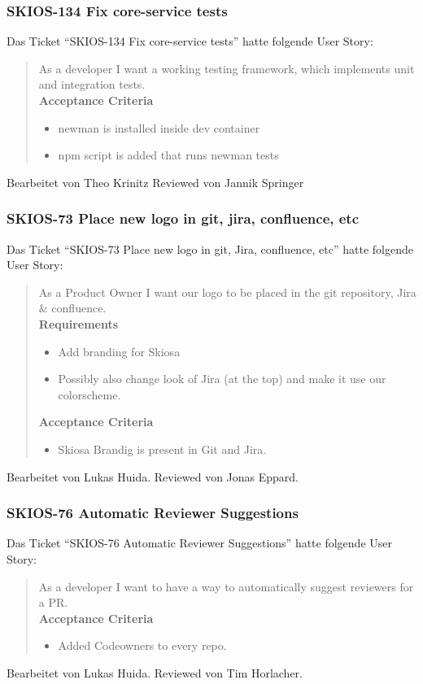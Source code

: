 \subsubsection{SKIOS-134 Fix core-service tests}
Das Ticket \enquote{SKIOS-134 Fix core-service tests} hatte folgende User Story:
\begin{quotation}
    As a developer I want a working testing framework, which implements unit and integration tests.\\
    \textbf{Acceptance Criteria}
    \begin{itemize}
        \item newman is installed inside dev container
        \item npm script is added that runs newman tests
    \end{itemize}
\end{quotation}
Bearbeitet von Theo Krinitz
Reviewed von Jannik Springer

\subsubsection{SKIOS-73 Place new logo in git, jira, confluence, etc}
Das Ticket \enquote{SKIOS-73 Place new logo in git, Jira, confluence, etc} hatte folgende User Story:
\begin{quotation}
    As a Product Owner I want our logo to be placed in the git repository, Jira \& confluence. \\
    \textbf{Requirements}
    \begin{itemize}
        \item Add branding for Skiosa
        \item Possibly also change look of Jira (at the top) and make it use our colorscheme.  
    \end{itemize}   
    
    \textbf{Acceptance Criteria}
    \begin{itemize}
        \item Skiosa Brandig is present in Git and Jira.
    \end{itemize}
\end{quotation}
Bearbeitet von Lukas Huida.
Reviewed von Jonas Eppard.

\subsubsection{SKIOS-76 Automatic Reviewer Suggestions}
Das Ticket \enquote{SKIOS-76 Automatic Reviewer Suggestions} hatte folgende User Story:
\begin{quotation}
    As a developer I want to have a way to automatically suggest reviewers for a PR. \\
    \textbf{Acceptance Criteria}
    \begin{itemize}
        \item Added Codeowners to every repo.
    \end{itemize}
\end{quotation}
Bearbeitet von Lukas Huida.
Reviewed von Tim Horlacher.


